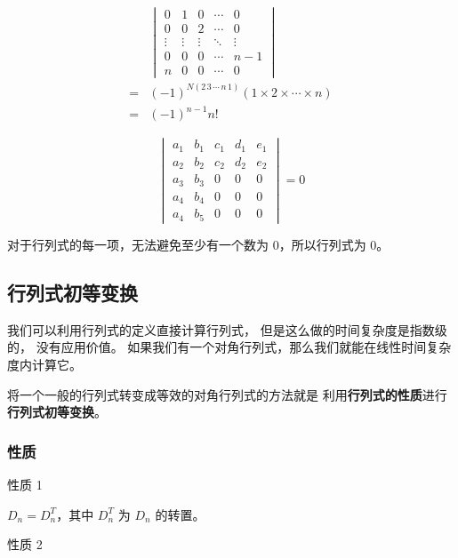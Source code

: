 \documentclass[UTF8]{article}
\begin{document}
	\begin{align*}
		&
		\begin{vmatrix}
			0 & 1 & 0 & \cdots & 0
			\\
			0 & 0 & 2 & \cdots & 0
			\\
			\vdots & \vdots & \vdots & \ddots & \vdots
			\\
			0 & 0 & 0 & \cdots & n - 1
			\\
			n & 0 & 0 & \cdots & 0
		\end{vmatrix}
		\\=&
		(-1)^{N(2 \, 3 \, \cdots \, n \, 1)} (1 \times 2 \times \cdots \times n)
		\\=&
		(-1)^{n - 1} n!
	\end{align*}


	\begin{equation*}
		\begin{vmatrix}
		a_1 & b_1 & c_1 & d_1 & e_1
		\\
		a_2 & b_2 & c_2 & d_2 & e_2
		\\
		a_3 & b_3 & 0 & 0 & 0
		\\
		a_4 & b_4 & 0 & 0 & 0
		\\
		a_4 & b_5 & 0 & 0 & 0
		\end{vmatrix}
		= 0
	\end{equation*}

	对于行列式的每一项，无法避免至少有一个数为 $0$，所以行列式为 $0$。

	\subsection{行列式初等变换}

	我们可以利用行列式的定义直接计算行列式，
	但是这么做的时间复杂度是指数级的，
	没有应用价值。
	如果我们有一个对角行列式，那么我们就能在线性时间复杂度内计算它。

	将一个一般的行列式转变成等效的对角行列式的方法就是
	利用\textbf{行列式的性质}进行\textbf{行列式初等变换}。

	\subsubsection{性质}

	性质 1
	
	\qquad $D_n = D_n^T$，其中 $D_n^T$ 为 $D_n$ 的转置。

	\bigskip

	性质 2
	
\end{document}

